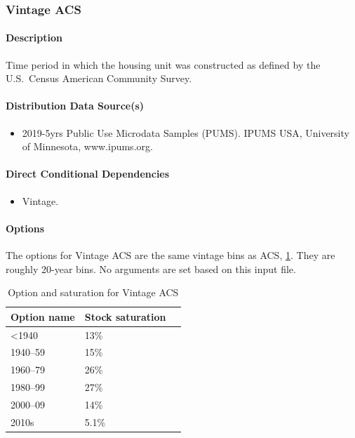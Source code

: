 \subsubsection{Vintage ACS}

\paragraph{Description}
Time period in which the housing unit was constructed as defined by the U.S.~Census American Community Survey.

\paragraph{Distribution Data Source(s)}
\begin{itemize}
    \item 2019-5yrs Public Use Microdata Samples (PUMS). IPUMS USA, University of Minnesota, www.ipums.org.
\end{itemize}

\paragraph{Direct Conditional Dependencies}
\begin{itemize}
    \item Vintage.
\end{itemize}

\paragraph{Options}
The options for Vintage ACS are the same vintage bins as ACS, \ref{table:hc_vintage_acs}. They are roughly 20-year bins. No arguments are set based on this input file.

\begin{longtable}[]{ |p{}|p{4cm}|p{4cm}| }
\caption{Option and saturation for Vintage ACS} \label{table:hc_vintage_acs} \\
\toprule\noalign{}
Option name & Stock saturation \\
\midrule\noalign{}
\endhead
\bottomrule\noalign{}
\endlastfoot
\textless1940 & 13\% \\
1940--59 & 15\% \\
1960--79 & 26\% \\
1980--99 & 27\% \\
2000--09 & 14\% \\
2010s & 5.1\% \\
\end{longtable}

